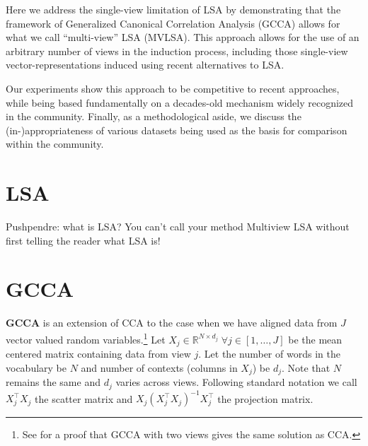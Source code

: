 \documentclass[11pt]{article}
\begin{document}
Here we address the single-view limitation of LSA by demonstrating
that the framework of Generalized Canonical Correlation Analysis
(GCCA) allows for what we call ``multi-view'' LSA (MVLSA).  This
approach allows for the use of an arbitrary number of views in the
induction process, including those single-view vector-representations
induced using recent alternatives to LSA.

Our experiments show this approach to be competitive to recent
approaches, while being based fundamentally on a decades-old mechanism
widely recognized in the community.  Finally, as a methodological
aside, we discuss the (in-)appropriateness of various datasets being
used as the basis for comparison within the community.


\section{LSA}

Pushpendre: what is LSA?  You can't call your method Multiview LSA
without first telling the reader what LSA is!


\section{GCCA}
\label{sec:gcca}
\textbf{GCCA} is an extension of CCA to the case when we have aligned
data from $J$ vector valued random variables.\footnote{See
  \cite{velden2011on} for a proof that GCCA with two views gives the
  same solution as CCA.}  Let $X_j \in \mathbb{R}^{N\times d_j} \;
\forall j \in [1,\ldots,J]$ be the mean centered matrix containing
data from view $j$. Let the number of words in the vocabulary be $N$
and number of contexts (columns in $X_j$) be $d_j$. Note that $N$
remains the same and $d_j$ varies across views. Following standard
notation \cite{hastie2009elements} we call $X_j^\top X_j$ the scatter
matrix and $X_j (X_j^\top X_j)^{-1}X_j^\top$ the projection matrix.
\end{document}
